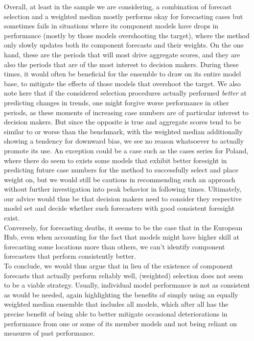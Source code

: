 Overall, at least in the sample we are considering, a combination of forecast selection and a weighted median mostly performs okay for forecasting cases but sometimes fails in situations where its component models have drops in performance (mostly by those models overshooting the target), where the method only slowly updates both its component forecasts and their weights. On the one hand, these are the periods that will most drive aggregate scores, and they are also the periods that are of the most interest to decision makers. During these times, it would often be beneficial for the ensemble to draw on its entire model base, to mitigate the effects of those models that overshoot the target. We also note here that if the considered selection procedures actually performed \textit{better} at predicting changes in trends, one might forgive worse performance in other periods, as these moments of increasing case numbers are of particular interest to decision makers. But since the opposite is true and aggregate scores tend to be similar to or worse than the benchmark, with the weighted median additionally showing a tendency for downward bias, we see no reason whatsoever to actually promote its use. An exception could be a case such as the cases series for Poland, where there do seem to exists some models that exhibit better foresight in predicting future case numbers for the method to successfully select and place weight on, but we would still be cautious in recommending such an approach without further investigation into peak behavior in following times. Ultimately, our advice would thus be that decision makers need to consider they respective model set and decide whether such forecasters with good consistent foresight exist.\\ 
Conversely, for forecasting deaths, it seems to be the case that in the European Hub, even when accounting for the fact that models might have higher skill at forecasting some locations more than others, we can't identify component forecasters that perform consistently better.\medskip\\ 
To conclude, we would thus argue that in lieu of the existence of component forecasts that actually perform reliably well, (weighted) selection does not seem to be a viable strategy. Usually, individual model performance is not as consistent as would be needed, again highlighting the benefits of simply using an equally weighted median ensemble that includes all models, which after all has the precise benefit of being able to better mitigate occasional deteriorations in performance from one or some of its member models and not being reliant on measures of past performance.\\
